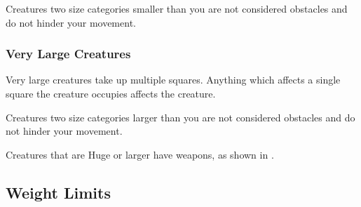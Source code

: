        Creatures two size categories smaller than you are not considered obstacles and do not hinder your movement.

    \subsubsection{Very Large Creatures}\label{Very Large Creatures}
       Very large creatures take up multiple squares. Anything which affects a single square the creature occupies affects the creature.

       Creatures two size categories larger than you are not considered obstacles and do not hinder your movement.

       Creatures that are Huge or larger have  weapons, as shown in .

  \subsection{Weight Limits}\label{Weight Limits}

